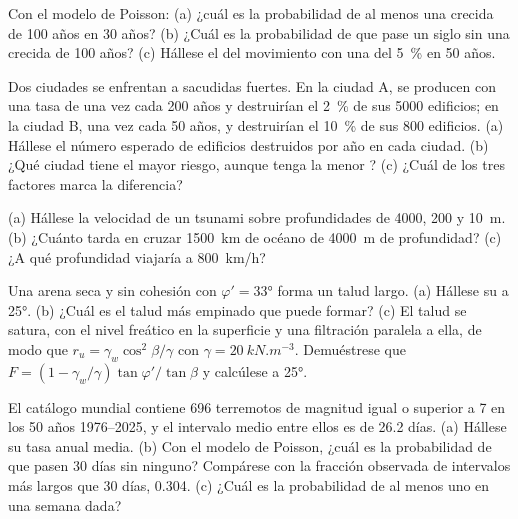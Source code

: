 \begin{exercise}[$\star$]\label{exo:b2:geological-hazards:1}
Con el modelo de Poisson: (a) ¿cuál es la probabilidad de al menos una crecida de 100 años en 30 años?
(b) ¿Cuál es la probabilidad de que pase un siglo sin una crecida de 100 años? (c) Hállese el 
del movimiento con una  del \qty{5}{\percent} en 50 años.
\end{exercise}

\begin{exercise}[$\star$]\label{exo:b2:geological-hazards:2}
Dos ciudades se enfrentan a sacudidas fuertes. En la ciudad A, se producen con una tasa de una vez cada 200 años y
destruirían el \qty{2}{\percent} de sus 5000 edificios; en la ciudad B, una vez cada 50 años, y destruirían el
\qty{10}{\percent} de sus 800 edificios. (a) Hállese el número esperado de edificios destruidos por
año en cada ciudad. (b) ¿Qué ciudad tiene el mayor riesgo, aunque tenga la menor ? (c)
¿Cuál de los tres factores marca la diferencia?
\end{exercise}

\begin{exercise}[$\star$]\label{exo:b2:geological-hazards:3}
(a) Hállese la velocidad de un tsunami sobre profundidades de 4000, 200 y \qty{10}{m}. (b) ¿Cuánto tarda
en cruzar \qty{1500}{km} de océano de \qty{4000}{m} de profundidad? (c) ¿A qué profundidad viajaría a
\qty{800}{km/h}?
\end{exercise}

\begin{exercise}[$\star$]\label{exo:b2:geological-hazards:4}
Una arena seca y sin cohesión con $\varphi' = \ang{33}$ forma un talud largo. (a) Hállese su  a \ang{25}. (b) ¿Cuál es el talud más empinado que puede formar? (c) El talud se satura, con
el nivel freático en la superficie y una filtración paralela a ella, de modo que $r_u = \gamma_w\cos^2\beta/\gamma$
con $\gamma = \qty{20}{kN.m^{-3}}$. Demuéstrese que $F = (1 - \gamma_w/\gamma)\tan\varphi'/\tan\beta$ y
calcúlese a \ang{25}.
\end{exercise}

\begin{exercise}[$\star\star$]\label{exo:b2:geological-hazards:5}
El catálogo mundial contiene 696 terremotos de magnitud igual o superior a 7 en los 50 años 1976--2025, y
el intervalo medio entre ellos es de 26.2 días. (a) Hállese su tasa anual media. (b) Con el modelo de
Poisson, ¿cuál es la probabilidad de que pasen 30 días sin ninguno? Compárese con la fracción observada
de intervalos más largos que 30 días, 0.304. (c) ¿Cuál es la probabilidad de al menos uno en una
semana dada?
\end{exercise}

